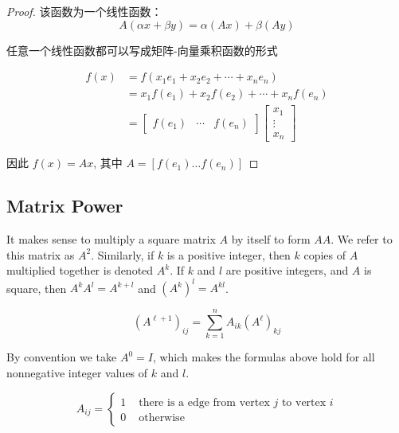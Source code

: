 \begin{proof}
    该函数为一个线性函数： $$ A(\alpha x+\beta y)=\alpha(A x)+\beta(A y) $$ 
    
    任意一个线性函数都可以写成矩阵-向量乘积函数的形式

    $$ \begin{aligned} f(x) &=f\left(x_{1} e_{1}+x_{2} e_{2}+\cdots+x_{n} e_{n}\right) \\ &=x_{1} f\left(e_{1}\right)+x_{2} f\left(e_{2}\right)+\cdots+x_{n} f\left(e_{n}\right) \\ &=\left[\begin{array}{lll}f\left(e_{1}\right) & \cdots & f\left(e_{n}\right)\end{array}\right]\left[\begin{array}{c}x_{1} \\ \vdots \\ x_{n}\end{array}\right] \end{aligned} $$

    因此 $ f(x)=A x $, 其中 $ A=\left[f\left(e_{1}\right) \ldots f\left(e_{n}\right)\right] $
\end{proof}

\subsection{Matrix Power}

\begin{definition}
    It makes sense to multiply a square matrix $ A $ by itself to form $ A A $. We refer to this matrix as $ A^{2} $. Similarly, if $ k $ is a positive integer, then $ k $ copies of $ A $ multiplied together is denoted $ A^{k} $. If $ k $ and $ l $ are positive integers, and $ A $ is square, then $ A^{k} A^{l}=A^{k+l} $ and $ \left(A^{k}\right)^{l}=A^{k l} $. 
    
    $$ \left(A^{\ell+1}\right)_{i j}=\sum_{k=1}^{n} A_{i k}\left(A^{\ell}\right)_{k j} $$

    By convention we take $ A^{0}=I $, which makes the
    formulas above hold for all nonnegative integer values of $k$ and $l$.
\end{definition}

 \begin{example}
        $$ A_{i j}=\left\{\begin{array}{ll}1 & \text { there is a edge from vertex } j \text { to vertex } i \\ 0 & \text { otherwise }\end{array}\right. $$
\end{example}

